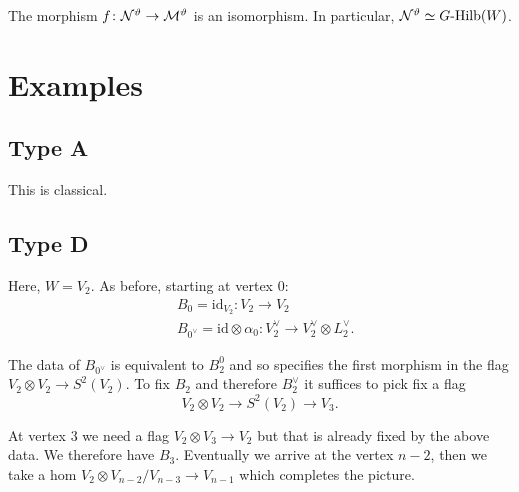 \documentclass{amsart}
\theoremstyle{definition}
\begin{document}
\begin{corollary}
The morphism $f \colon \mathcal{N}^\vartheta \rightarrow \mathcal{M}^\vartheta$ is an isomorphism.
In particular, $\mathcal{N}^\vartheta \simeq G\textup{-Hilb}(W)$.
\end{corollary}

\section{Examples}



\subsection{Type A}

This is classical.

\subsection{Type D}
Here, $W=V_2$. 
As before, starting at vertex $0$: 
\begin{align*}
    &B_0=\text{id}_{V_2} \colon V_2 \longrightarrow V_2 \\
    &B_{0^\vee} = \text{id} \otimes \alpha_0 \colon V_2^\vee \longrightarrow V_2^\vee \otimes L_2^\vee.
\end{align*}

The data of $B_{0^\vee}$ is equivalent to $B_2^0$ and so specifies the first morphism in the flag $V_2 \otimes V_2 \rightarrow S^2(V_2)$.
To fix $B_2$ and therefore $B_2^\vee$ it suffices to pick fix a flag 
$$V_2 \otimes V_2 \rightarrow S^2(V_2) \rightarrow V_3.$$

At vertex $3$ we need a flag $V_2 \otimes V_3 \rightarrow V_2$ but that is already fixed by the above data.
We therefore have $B_3$.
Eventually we arrive at the vertex ${n-2}$, then we take a hom $V_2 \otimes V_{n-2} / V_{n-3} \rightarrow V_{n-1}$ which completes the picture.




\end{document}
